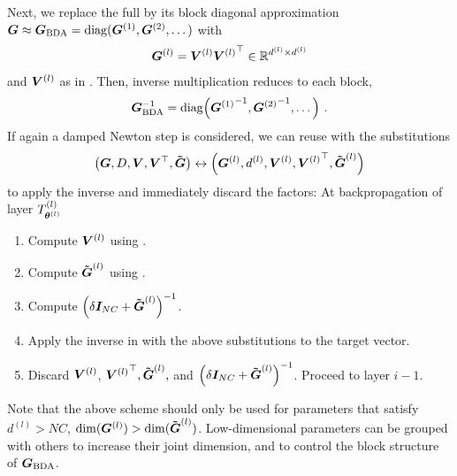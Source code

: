 Next, we replace the full \ggn by its block diagonal approximation ${\bm{G}} \approx
{\bm{G}}_{\text{BDA}} = \operatorname{diag}({\bm{G}}^{(1)}, {\bm{G}}^{(2)}, \dots)$ with
\begin{align*}
  {\bm{G}}^{(l)} = {\bm{V}}^{(l)} {{\bm{V}}^{(l)}}^\top \in {\mathbb{R}}^{d^{(l)} \times d^{(l)}}
\end{align*}
and ${\bm{V}}^{(l)}$ as in . Then, inverse
multiplication reduces to each block,
\begin{align*}
  {\bm{G}}_{\text{BDA}}^{-1} = \operatorname{diag}\!\left({{\bm{G}}^{(1)}}^{-1}, {{\bm{G}}^{(2)}}^{-1}, \dots\right)\,.
\end{align*}
If again a damped Newton step is considered, we can reuse 
with the substitutions
\begin{align*}
  \left({\bm{G}}, D, {\bm{V}}, {\bm{V}}^\top, \bm{\tilde{{\bm{G}}}}\right)
  \leftrightarrow \left( {\bm{G}}^{(l)}, d^{(l)}, {\bm{V}}^{(l)}, {{\bm{V}}^{(l)}}^\top, \bm{\tilde{{\bm{G}}}}^{(l)}\right)
\end{align*}
to apply the inverse and immediately discard the \vivit factors:
At backpropagation of layer $T^{(l)}_{{\bm{\theta}}^{(l)}}$
\begin{enumerate}
\item Compute ${\bm{V}}^{(l)}$ using .
\item Compute $\bm{\tilde{{\bm{G}}}}^{(l)}$ using .
\item Compute $\left(\delta {\bm{I}}_{NC} + \bm{\tilde{{\bm{G}}}}^{(l)}\right)^{-1}$.
\item Apply the inverse in  with the above substitutions to the target vector.
\item Discard ${\bm{V}}^{(l)}$, ${{\bm{V}}^{(l)}}^\top, \bm{\tilde{{\bm{G}}}}^{(l)},$ and $\left(\delta
    {\bm{I}}_{NC} + \bm{\tilde{{\bm{G}}}}^{(l)}\right)^{-1}$. Proceed to layer $i-1$.
\end{enumerate}
Note that the above scheme should only be used for parameters that satisfy
$d^{(l)} > NC$, \ie $\dim({\bm{G}}^{(l)}) > \dim(\bm{\tilde{{\bm{G}}}}^{(l)})$. Low-dimensional
parameters can be grouped with others to increase their joint dimension, and to
control the block structure of ${\bm{G}}_{\text{BDA}}$.

